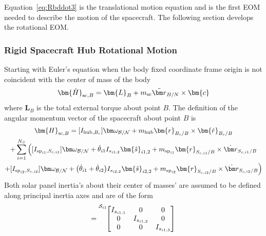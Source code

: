 Equation~\eqref{eq:Rbddot3} is the translational motion equation and is the first EOM needed to describe the motion of the spacecraft. The following section develops the rotational EOM.

\subsubsection{Rigid Spacecraft Hub Rotational Motion}

Starting with Euler's equation when the body fixed coordinate frame origin is not coincident with the center of mass of the body\cite{schaub}
\begin{equation}
	\bm{\dot{H}}_{\text{sc},B} = \bm{L}_B+m_{\text{\text{sc}}}\ddot{\bm r}_{B/N}\times\bm{c}
	\label{eq:Euler}
\end{equation}
where $\bm{L}_B$ is the total external torque about point $B$. The definition of the angular momentum vector of the spacecraft about point $B$ is
\begin{multline}
	\bm{H}_{\text{sc},B} = [I_{\text{hub},B_c}] \bm\omega_{\cal B/N} + m_{\text{hub}} \bm{r}_{B_c/B}\times\bm{\dot{r}}_{B_c/B} \\ +\sum\limits_{i=1}^{N_S}\Big( [I_{\text{sp}_{i1},S_{c,i1}}] \bm\omega_{\cal B/N} + \dot{\theta}_{i1} I_{s_{i1,2}}\bm{\hat{s}}_{i1,2}+m_{\text{sp}_{i1}} \bm{r}_{S_{c,i1}/B} \times \dot{\bm r}_{S_{c,i1}/B}\\
	+ [I_{\text{sp}_{i2},S_{c,i2}}] \bm\omega_{\cal B/N} + \big(\dot{\theta}_{i1} + \dot{\theta}_{i2}\big) I_{s_{i2,2}}\bm{\hat{s}}_{i2,2}+m_{\text{sp}_{i2}} \bm{r}_{S_{c,i2}/B} \times \dot{\bm r}_{S_{c,i2}/B}\Big)
	\label{eq:Hb2}
\end{multline}
Both solar panel inertia's about their center of masses' are assumed to be defined along principal inertia axes and are of the form
\begin{equation}
	[I_{\text{sp}_{i1},S_{c,i1}}] = {\vphantom{\begin{bmatrix}
				I_{s_{i1,1}} & 0 & 0 \\
				0 & I_{s_{i1,2}} & 0 \\
				0 & 0 & I_{s_{i1,3}}
	\end{bmatrix}}}^{\mathcal{S}_{i1}\!}{\begin{bmatrix}
			I_{s_{i1,1}} & 0 & 0 \\
			0 & I_{s_{i1,2}} & 0 \\
			0 & 0 & I_{s_{i1,3}}
	\end{bmatrix}}
	\label{eq:IspMatrix}
\end{equation}

